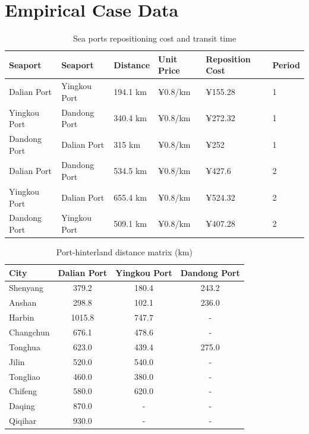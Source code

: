 \documentclass[preprint,12pt]{elsarticle}
\begin{document}
\section{Empirical Case Data}\label{app2}

\begin{table}[htbp]
\centering
\caption{Sea ports repositioning cost and transit time}
\label{tab:seaport_repositioning}
\small
\setlength{\tabcolsep}{4pt}
\begin{tabular}{llllll}
\hline
Seaport & Seaport & Distance & Unit Price & Reposition Cost & Period \\
\hline
Dalian Port & Yingkou Port & 194.1 km & ¥0.8/km & ¥155.28 & 1 \\
Yingkou Port & Dandong Port & 340.4 km & ¥0.8/km & ¥272.32 & 1 \\
Dandong Port & Dalian Port & 315 km & ¥0.8/km & ¥252 & 1 \\
Dalian Port & Dandong Port & 534.5 km & ¥0.8/km & ¥427.6 & 2 \\
Yingkou Port & Dalian Port & 655.4 km & ¥0.8/km & ¥524.32 & 2 \\
Dandong Port & Yingkou Port & 509.1 km & ¥0.8/km & ¥407.28 & 2 \\
\hline
\end{tabular}
\end{table}

\begin{table}[htbp]
\centering
\caption{Port-hinterland distance matrix (km)}
\label{tab:port_hinterland_distance}
\small
\setlength{\tabcolsep}{4pt}
\begin{tabular}{lccc}
\hline
City & {Dalian Port} & {Yingkou Port} & {Dandong Port} \\
\hline
Shenyang  & 379.2 & 180.4 & 243.2 \\
Anshan    & 298.8 & 102.1 & 236.0 \\
Harbin   & 1015.8 & 747.7 & - \\
Changchun & 676.1 & 478.6 & - \\
Tonghua   & 623.0 & 439.4 & 275.0 \\
Jilin     & 520.0 & 540.0 & - \\
Tongliao  & 460.0 & 380.0 & - \\
Chifeng   & 580.0 & 620.0 & - \\
Daqing    & 870.0 & - & - \\
Qiqihar  & 930.0 & - & - \\
\hline
\end{tabular}
\end{table}
\end{document}
